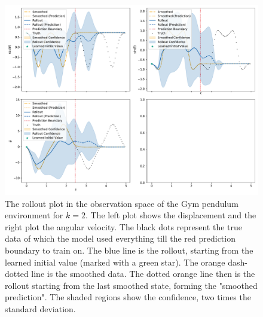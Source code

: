 		\begin{figure}
			\centering
			\includegraphics[width=\linewidth]{figures/results/pendulum-gym/run-latent-dim-02/rollout-observations-N0.pdf}
			\caption{The rollout plot in the observation space of the Gym pendulum environment for \(k = 2\). The left plot shows the displacement and the right plot the angular velocity. The black dots represent the true data of which the model used everything till the red prediction boundary to train on. The blue line is the rollout, starting from the learned initial value (marked with a green star). The orange dash-dotted line is the smoothed data. The dotted orange line then is the rollout starting from the last smoothed state, forming the "smoothed prediction". The shaded regions show the confidence, \ie two times the standard deviation.}
			\label{fig:gymPendulumRolloutL02}
		\end{figure}

